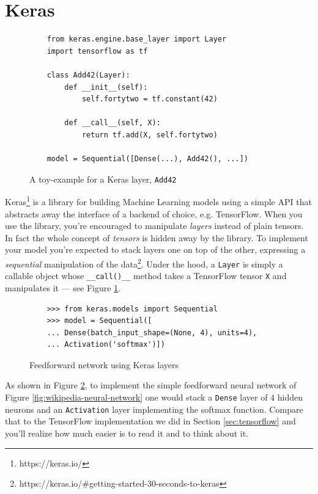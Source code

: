 \section{Keras}
\label{sec:keras}

\begin{figure}
  \begin{verbatim}
    from keras.engine.base_layer import Layer
    import tensorflow as tf

    class Add42(Layer):
        def __init__(self):
            self.fortytwo = tf.constant(42)

        def __call__(self, X):
            return tf.add(X, self.fortytwo)

    model = Sequential([Dense(...), Add42(), ...])
  \end{verbatim}
  \caption{A toy-example for a Keras layer, \texttt{Add42}}
  \label{fig:toy-layer}
\end{figure}

Keras\footnote{https://keras.io/} is a library for building Machine
Learning models using a simple API that abstracts away the interface of
a backend of choice, e.g. TensorFlow. When you use the library, you're
encouraged to manipulate \emph{layers} instead of plain tensors. In
fact the whole concept of \emph{tensors} is hidden away by the library.
To implement your model you're expected to stack layers one on top of the
other, expressing a \emph{sequential} manipulation of the
data\footnote{https://keras.io/\#getting-started-30-seconds-to-keras}.
Under the hood, a \texttt{Layer} is simply a callable object whose
\texttt{\_\_call()\_\_} method takes a TensorFlow tensor \texttt{X} and
manipulates it --- see Figure \ref{fig:toy-layer}.

\begin{figure}
  \begin{verbatim}
    >>> from keras.models import Sequential
    >>> model = Sequential([
    ... Dense(batch_input_shape=(None, 4), units=4),
    ... Activation('softmax')])
  \end{verbatim}
  \caption{Feedforward network using Keras layers}
  \label{fig:feedforward-with-layers}
\end{figure}

As shown in Figure \ref{fig:feedforward-with-layers}, to implement the
simple feedforward neural network of Figure
\ref{fig:wikipedia-neural-network} one would stack a \texttt{Dense}
layer of 4 hidden neurons and an \texttt{Activation} layer implementing
the softmax function. Compare that to the TensorFlow implementation we
did in Section \ref{sec:tensorflow} and you'll realize how much easier
is to read it and to think about it.

